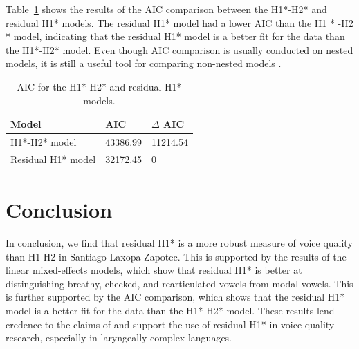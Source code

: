 Table~\ref{tab:Comparison} shows the results of the AIC comparison between the H1*-H2* and residual H1* models. The residual H1* model had a lower AIC than the H1 * -H2 * model, indicating that the residual H1* model is a better fit for the data than the H1*-H2* model. Even though AIC comparison is usually conducted on nested models, it is still a useful tool for comparing non-nested models \citep{burnhamMultimodelInferenceUnderstanding2004,burnhamAICModelSelection2011,burnhamModelSelectionMultimodel2004}.

\begin{table}[!h]
  \centering
  \caption{AIC for the H1*-H2* and residual H1* models.}
  \label{tab:Comparison}
  \begin{tabular}{lll}
    Model  & AIC & $\Delta$ AIC\\
    \hline
    H1*-H2* model & 43386.99 & 11214.54 \\
    Residual H1* model & 32172.45 & 0 \\
  \end{tabular}
\end{table}

\section{Conclusion} \label{sec:Conclusion}

In conclusion, we find that residual H1* is a more robust measure of voice quality than H1-H2 in Santiago Laxopa Zapotec. This is supported by the results of the linear mixed-effects models, which show that residual H1* is better at distinguishing breathy, checked, and rearticulated vowels from modal vowels. This is further supported by the AIC comparison, which shows that the residual H1* model is a better fit for the data than the H1*-H2* model. These results lend credence to the claims of \citet{chaiH1H2Acoustic2022} and support the use of residual H1* in voice quality research, especially in laryngeally complex languages.